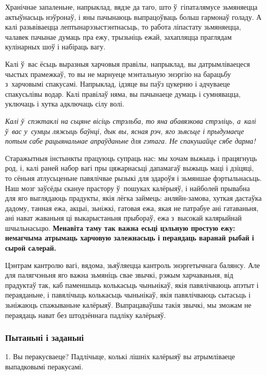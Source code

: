 Хранічнае запаленьне, напрыклад, вядзе да таго, што ў~гіпаталямусе зьмяняецца актыўнасьць нэўронаў, і яны пачынаюць выпрацоўваць больш гармонаў голаду. А калі разьвіваецца лептынарэзыстэнтнасьць, то работа ліпастату зьмяняецца, чалавек пачынае думаць пра ежу, трызьніць ежай, захапляцца праглядам кулінарных шоў і набіраць вагу.

Калі ў~вас ёсьць выразныя харчовыя правілы, напрыклад, вы датрымліваецеся чыстых прамежкаў, то вы не марнуеце мэнтальную энэргію на барацьбу з~харчовымі спакусамі. Напрыклад, ідзяце вы паўз цукерню і адчуваеце спакусьлівы водар. Калі правілаў няма, вы пачынаеце думаць і сумнявацца, уключаць і хутка адключаць сілу волі.

\emph{Калі ў~спэктаклі на сьцяне вісіць стрэльба, то яна абавязкова стрэліць, а~калі ў~вас у~сумцы ляжыць баўнці, дык вы, ясная рэч, яго зьясьце і прыдумаеце потым сабе рацыянальнае апраўданьне для гэтага. Не спакушайце сябе дарма!}

Старажытныя інстынкты працуюць супраць нас: мы хочам выжыць і працягнуць род, і, калі раней набор вагі пры цяжарнасьці дапамагаў выжыць маці і дзіцяці, то сёньня атлусьценьне павялічвае рызыкі для здароўя і зьмяншае фэртыльнасьць. Наш мозг заўсёды скануе прастору ў~пошуках калёрыяў, і найболей прывабна для яго выглядаюць прадукты, якія лёгка займець: анляйн-замова, хуткая дастаўка дадому, танная ежа, акцыі, зьніжкі, гатовая ежа, якая не патрабуе ані гатаваньня, ані нават жаваньня ці выкарыстаньня прыбораў, ежа з~высокай калярыйнай шчыльнасьцю. \textbf{Менавіта таму так важна есьці цэльную простую ежу: немагчыма атрымаць харчовую залежнасьць і пераядаць варанай рыбай і сырой салерай.}

Цэнтрам кантролю вагі, вядома, зьяўляецца кантроль энэргетычнага балянсу. Але для палягчэньня яго важна зьмяніць свае звычкі, рэжым харчаваньня, від прадуктаў так, каб паменшыць колькасьць чыньнікаў, якія павялічваюць апэтыт і пераяданьне, і павялічыць колькасьць чыньнікаў, якія павялічваюць сытасьць і зьніжаюць спажываньне калёрыяў. Выпрацаваўшы такія звычкі, мы зможам не пераядаць нават без штодзённага падліку калёрыяў.

\subsubsection{Пытаньні і заданьні}

1. Вы перакусваеце? Падлічыце, колькі лішніх калёрыяў вы атрымліваеце выпадковымі перакусамі.

